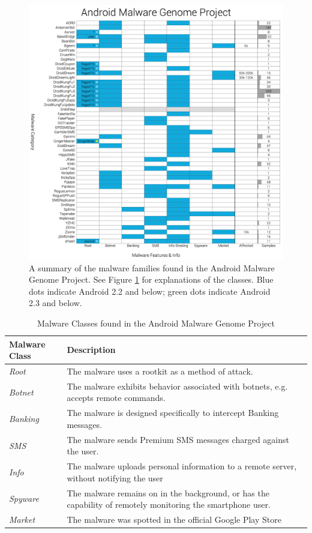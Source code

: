 \begin{figure}[h]
\begin{center}
\includegraphics[width=0.85\columnwidth]{figs/NCSUMalwareDataset}
\caption{A summary of the malware families found in the Android Malware Genome Project. See Figure \ref{tab:malwaredbcategories} for explanations of the classes. Blue dots indicate Android 2.2 and below; green dots indicate Android 2.3 and below.}
\label{fig:malwaredboverview}
\end{center}
\end{figure}

\begin{table}[h]
\begin{small}
\begin{tabular}{p{3cm}|p{12.5cm}}
Malware Class & Description \\
\hline

\textit{Root} & The malware uses a rootkit as a method of attack.    \\
\textit{Botnet} & The malware exhibits behavior associated with botnets, e.g. accepts remote commands.    \\
\textit{Banking} & The malware is designed specifically to intercept Banking messages.    \\
\textit{SMS} & The malware sends Premium SMS messages charged against the user.    \\
\textit{Info} &  The malware uploads personal information to a remote server, without notifying the user   \\
\textit{Spyware} & The malware remains on in the background, or has the capability of remotely monitoring the smartphone user.    \\
\textit{Market} &  The malware was spotted in the official Google Play Store   \\

\end{tabular}
\end{small}
\caption{Malware Classes found in the Android Malware Genome Project}
\label{tab:malwaredbcategories}
\end{table}


